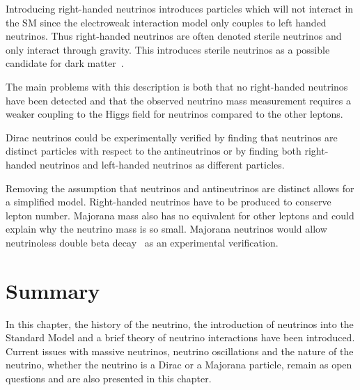 Introducing right-handed neutrinos introduces particles which will not interact in the SM since the electroweak interaction model only couples to left handed neutrinos. Thus right-handed neutrinos are often denoted sterile neutrinos and only interact through gravity. This introduces sterile neutrinos as a possible candidate for dark matter~\cite{SterileDark, SUSYdark}.

The main problems with this description is both that no right-handed neutrinos have been detected and that the observed neutrino mass measurement requires a weaker coupling to the Higgs field for neutrinos compared to the other leptons.

Dirac neutrinos could be experimentally verified by finding that neutrinos are distinct particles with respect to the antineutrinos or by finding both right-handed neutrinos and left-handed neutrinos as different particles.

Removing the assumption that neutrinos and antineutrinos are distinct allows for a simplified model. Right-handed neutrinos have to be produced to conserve lepton number. Majorana mass also has no equivalent for other leptons and could explain why the neutrino mass is so small. Majorana neutrinos would allow neutrinoless double beta decay~\cite{NeuLess} as an experimental verification.

\section{Summary}
In this chapter, the history of the neutrino, the introduction of neutrinos into the Standard Model and a brief theory of neutrino interactions have been introduced. Current issues with massive neutrinos, neutrino oscillations and the nature of the neutrino, whether the neutrino is a Dirac or a Majorana particle, remain as open questions and are also presented in this chapter.


%
